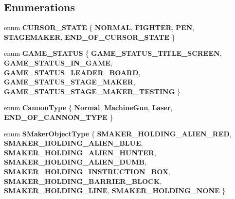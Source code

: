 \subsection*{Enumerations}
\begin{DoxyCompactItemize}
\item 
\mbox{\label{namespacegame_a234d9c40d2d29f84b44e00ff317911c9}} 
enum {\bfseries C\+U\+R\+S\+O\+R\+\_\+\+S\+T\+A\+TE} \{ \newline
{\bfseries N\+O\+R\+M\+AL}, 
{\bfseries F\+I\+G\+H\+T\+ER}, 
{\bfseries P\+EN}, 
{\bfseries S\+T\+A\+G\+E\+M\+A\+K\+ER}, 
\newline
{\bfseries E\+N\+D\+\_\+\+O\+F\+\_\+\+C\+U\+R\+S\+O\+R\+\_\+\+S\+T\+A\+TE}
 \}
\item 
\mbox{\label{namespacegame_a508271dc9f77165b6b935b859341bcd2}} 
enum {\bfseries G\+A\+M\+E\+\_\+\+S\+T\+A\+T\+US} \{ \newline
{\bfseries G\+A\+M\+E\+\_\+\+S\+T\+A\+T\+U\+S\+\_\+\+T\+I\+T\+L\+E\+\_\+\+S\+C\+R\+E\+EN}, 
{\bfseries G\+A\+M\+E\+\_\+\+S\+T\+A\+T\+U\+S\+\_\+\+I\+N\+\_\+\+G\+A\+ME}, 
{\bfseries G\+A\+M\+E\+\_\+\+S\+T\+A\+T\+U\+S\+\_\+\+L\+E\+A\+D\+E\+R\+\_\+\+B\+O\+A\+RD}, 
{\bfseries G\+A\+M\+E\+\_\+\+S\+T\+A\+T\+U\+S\+\_\+\+S\+T\+A\+G\+E\+\_\+\+M\+A\+K\+ER}, 
\newline
{\bfseries G\+A\+M\+E\+\_\+\+S\+T\+A\+T\+U\+S\+\_\+\+S\+T\+A\+G\+E\+\_\+\+M\+A\+K\+E\+R\+\_\+\+T\+E\+S\+T\+I\+NG}
 \}
\item 
\mbox{\label{namespacegame_aecc56fdabec845f44c9322f7a24e60a1}} 
enum {\bfseries Cannon\+Type} \{ {\bfseries Normal}, 
{\bfseries Machine\+Gun}, 
{\bfseries Laser}, 
{\bfseries E\+N\+D\+\_\+\+O\+F\+\_\+\+C\+A\+N\+N\+O\+N\+\_\+\+T\+Y\+PE}
 \}
\item 
\mbox{\label{namespacegame_a2e5095a07594e6a242239a38a533632a}} 
enum {\bfseries S\+Maker\+Object\+Type} \{ \newline
{\bfseries S\+M\+A\+K\+E\+R\+\_\+\+H\+O\+L\+D\+I\+N\+G\+\_\+\+A\+L\+I\+E\+N\+\_\+\+R\+ED}, 
{\bfseries S\+M\+A\+K\+E\+R\+\_\+\+H\+O\+L\+D\+I\+N\+G\+\_\+\+A\+L\+I\+E\+N\+\_\+\+B\+L\+UE}, 
{\bfseries S\+M\+A\+K\+E\+R\+\_\+\+H\+O\+L\+D\+I\+N\+G\+\_\+\+A\+L\+I\+E\+N\+\_\+\+H\+U\+N\+T\+ER}, 
{\bfseries S\+M\+A\+K\+E\+R\+\_\+\+H\+O\+L\+D\+I\+N\+G\+\_\+\+A\+L\+I\+E\+N\+\_\+\+D\+U\+MB}, 
\newline
{\bfseries S\+M\+A\+K\+E\+R\+\_\+\+H\+O\+L\+D\+I\+N\+G\+\_\+\+I\+N\+S\+T\+R\+U\+C\+T\+I\+O\+N\+\_\+\+B\+OX}, 
{\bfseries S\+M\+A\+K\+E\+R\+\_\+\+H\+O\+L\+D\+I\+N\+G\+\_\+\+B\+A\+R\+R\+I\+E\+R\+\_\+\+B\+L\+O\+CK}, 
{\bfseries S\+M\+A\+K\+E\+R\+\_\+\+H\+O\+L\+D\+I\+N\+G\+\_\+\+L\+I\+NE}, 
{\bfseries S\+M\+A\+K\+E\+R\+\_\+\+H\+O\+L\+D\+I\+N\+G\+\_\+\+N\+O\+NE}
 \}
\end{DoxyCompactItemize}



